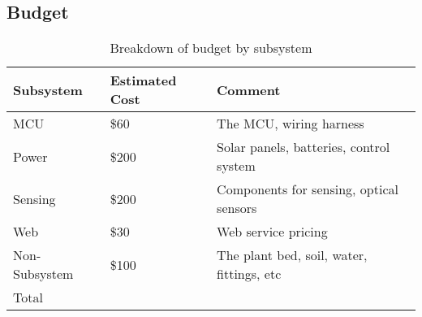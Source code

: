\subsection{Budget}
\begin{table}[H]
    \centering
    \begin{tabularx}{.8\textwidth}
        {
            | >{\raggedright\arraybackslash}X
            | >{\raggedright\arraybackslash}X
            | >{\raggedleft\arraybackslash}X
            |
        }
        \caption{Breakdown of budget by subsystem}\\
        \hline
        Subsystem & Estimated Cost & Comment \\
        \hline
        MCU & \$60 & The MCU, wiring harness \\         %
        \hline
        Power & \$200 & Solar panels, batteries, control system \\
        \hline
        Sensing & \$200 & Components for sensing, optical sensors \\ %
        \hline
        Web & \$30 & Web service pricing \\             %
        \hline
        Non-Subsystem & \$100 & The plant bed, soil, water, fittings, etc \\
        \hline
        Total & \multicolumn{2}{|c|}{\$590}\\           %
        \hline
    \end{tabularx}
\end{table}